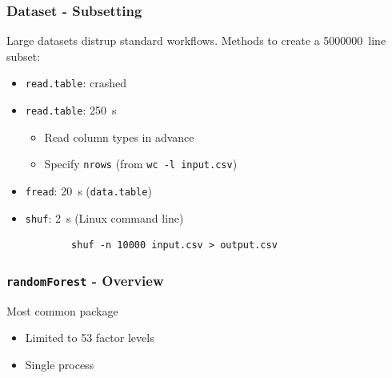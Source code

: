 \documentclass[11pt, compress]{beamer}
\begin{document}
\begin{frame}[fragile]
  \frametitle{Dataset - Subsetting}
    Large datasets distrup standard workflows. Methods to create a \SI{5000000}{line} subset:
  \begin{itemize}
    \item \texttt{read.table}: crashed
    \item \texttt{read.table}: \SI{250}{\second}
    \begin{itemize}
        \item Read column types in advance
        \item Specify \texttt{nrows} (from \texttt{wc -l input.csv})
    \end{itemize}
    \item \texttt{fread}: \SI{20}{\second} (\texttt{data.table})
    \item \texttt{shuf}: \SI{2}{\second} (Linux command line)
    \begin{verbatim}
        shuf -n 10000 input.csv > output.csv
    \end{verbatim}

\end{itemize}
\end{frame}

\begin{frame}[fragile]
  \frametitle{\texttt{randomForest} - Overview}
  
  
  
    Most common package
  \begin{itemize}
    \item Limited to 53 factor levels
    \item Single process
\end{itemize}
\end{frame}
\end{document}
